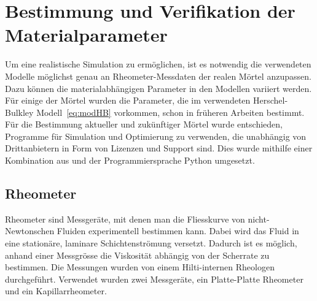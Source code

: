 \section{Bestimmung und Verifikation der Materialparameter}
\label{Kapitel:Parameter}
Um eine realistische Simulation zu ermöglichen, ist es notwendig die verwendeten Mo\-delle möglichst genau an Rheometer-Messdaten der realen Mörtel anzupassen. Dazu können die materialabhängigen Parameter in den Modellen variiert werden.
Für einige der Mörtel wurden die Parameter, die im verwendeten Herschel-Bulkley Modell~\eqref{eq:modHB} vorkommen, schon in früheren Arbeiten bestimmt.
Für die Bestimmung aktueller und zukünftiger Mörtel  wurde entschieden, Programme für Simulation und Optimierung zu verwenden, die unabhängig von Drittanbietern in Form von Lizenzen und Support sind.
Dies wurde mithilfe einer Kombination aus \openfoam{} und der Programmiersprache Python umgesetzt.
%
\subsection{Rheometer}
Rheometer sind Messgeräte, mit denen man die Fliesskurve von nicht-Newtonschen Fluiden experimentell bestimmen kann.
Dabei wird das Fluid in eine stationäre, laminare Schichtenströmung versetzt. Dadurch ist es möglich, anhand einer
Messgrösse die Viskosität abhängig von der Scherrate zu bestimmen.
Die Messungen wurden von einem Hilti-internen Rheo\-logen durchgeführt. Verwendet wurden zwei Messgeräte, ein Platte-Platte Rheometer und ein Kapillarrheometer.
%

